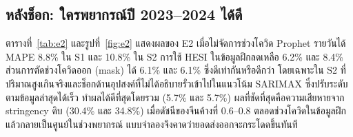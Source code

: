 \documentclass{article}
\theoremstyle{definition}
\begin{document}
\subsection{หลังช็อก: ใครพยากรณ์ปี 2023--2024 ได้ดี}
ตารางที่~\ref{tab:e2} และรูปที่~\ref{fig:e2} แสดงผลของ E2 เมื่อไม่จัดการช่วงโควิด Prophet รายวันได้ MAPE 8.8\% ใน S1 และ 10.8\% ใน S2 การใช้ HESI ในข้อมูลฝึกลดเหลือ 6.2\% และ 8.4\% ส่วนการตัดช่วงโควิดออก (mask) ได้ 6.1\% และ 6.1\% ซึ่งดีเท่ากันหรือดีกว่า โดยเฉพาะใน S2 ที่ปริมาณสูงเกินจริงและช็อกด้านอุปสงค์ที่ไม่ได้อธิบายรั่วเข้าไปในแนวโน้ม SARIMAX ซึ่งปรับระดับตามข้อมูลล่าสุดได้เร็ว ทำผลได้ดีที่สุดโดยรวม (5.7\% และ 5.7\%) ผลที่ชัดที่สุดคือความเสียหายจาก stringency ดิบ (30.4\% และ 34.8\%) เมื่อดัชนีของจีนค้างที่ 0.6--0.8 ตลอดช่วงโควิดในข้อมูลฝึกแล้วกลายเป็นศูนย์ในช่วงพยากรณ์ แบบจำลองจึงคาดว่ายอดส่งออกจะกระโดดขึ้นทันที
\end{document}
